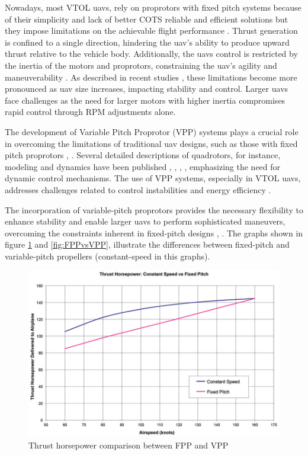 Nowadays, most \gls{VTOL} \glspl{uav}, rely on proprotors with fixed pitch systems because of their simplicity and lack of better \gls{COTS} reliable and efficient solutions but they impose limitations on the achievable flight performance \cite{FPP1}.
Thrust generation is confined to a single direction, hindering the \gls{uav}'s ability to produce upward thrust relative to the vehicle body.
Additionally, the \glspl{uav} control is restricted by the inertia of the motors and proprotors, constraining the \gls{uav}'s agility and maneuverability \cite{FPP1}.
As described in recent studies \cite{FPP1}, these limitations become more pronounced as \gls{uav} size increases, impacting stability and control.
Larger \glspl{uav} face challenges as the need for larger motors with higher inertia compromises rapid control through \gls{RPM} adjustments alone.

The development of Variable Pitch Proprotor (VPP) systems plays a crucial role in overcoming the limitations of traditional \gls{uav} designs, such as those with fixed pitch proprotors \cite{FPP1}, \cite{VPP1}.
Several detailed descriptions of quadrotors, for instance, modeling and dynamics have been published \cite{FPP2}, \cite{FPP3}, \cite{FPP4}, \cite{FPP5}, emphasizing the need for dynamic control mechanisms.
The use of VPP systems, especially in \gls{VTOL} \glspl{uav}, addresses challenges related to control instabilities and energy efficiency \cite{VPP1}.

The incorporation of variable-pitch proprotors provides the necessary flexibility to enhance stability and enable larger \glspl{uav} to perform sophisticated maneuvers, overcoming the constraints inherent in fixed-pitch designs \cite{FPP1}, \cite{VPP1}.
The graphs shown in figure \ref{fig:FPPvsVPP2} and \ref{fig:FPPvsVPP}, illustrate the differences between fixed-pitch and variable-pitch propellers (constant-speed in this graphs).

\begin{figure}[H]
    \centering
    \includegraphics[scale=0.45]{ch1/assests/FPPvsVPP2.jpg}
    \caption{Thrust horsepower comparison between FPP and VPP \cite{VPP7}}
    \label{fig:FPPvsVPP2}
\end{figure}

